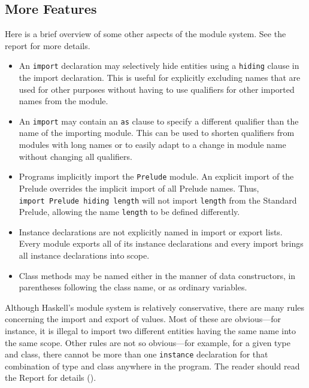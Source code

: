 \subsection{More Features}

\label{tut-rules}
Here is a brief overview of some other aspects of the module system.
See the report for more details.
\begin{itemize}
\item An \mbox{\tt import} declaration may selectively hide entities using a
\mbox{\tt hiding} clause in the
import declaration.  This is useful for explicitly excluding names that
are used for other purposes without having to use qualifiers for other
imported names from the module.
\item An \mbox{\tt import} may contain an \mbox{\tt as} clause to specify a different
qualifier than the name of the importing module.  This can be used to
shorten qualifiers from modules with long names or to easily adapt to
a change in module name without changing all qualifiers.
\item Programs implicitly import the \mbox{\tt Prelude} module.  An explicit
import of the Prelude overrides the implicit import of all Prelude
names.  Thus,
\bprog
\mbox{\tt import\ Prelude\ hiding\ length}
\eprog
will not import \mbox{\tt length} from the Standard Prelude, allowing the name
\mbox{\tt length} to be defined differently.

\item Instance declarations are not explicitly named in import or
export lists.  Every module exports all of its instance declarations
and every import brings all instance declarations into scope.
\item Class methods may be named either in the manner of data
constructors, in parentheses following the class name, or as ordinary
variables. 
\end{itemize}
Although Haskell's module system is relatively conservative, there are
many rules concerning the import and export of values.  Most of these
are obvious---for instance, it is illegal to import two different
entities having the same name into the same scope.  Other rules are
not so obvious---for example, for a given type and class, there cannot
be more than one \mbox{\tt instance} declaration for that combination of type
and class anywhere in the program.
The reader should read the Report for details
().



